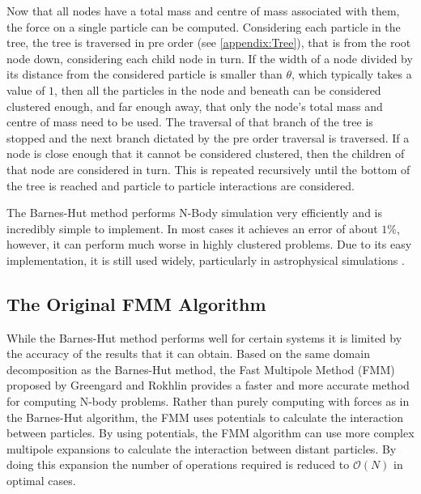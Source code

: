 Now that all nodes have a total mass and centre of mass associated with them, the force on a single particle can be computed. Considering each particle in the tree, the tree is traversed in pre order (see \cref{appendix:Tree}), that is from the root node down, considering each child node in turn. If the width of a node divided by its distance from the considered particle is smaller than $\theta$, which typically takes a value of $1$, then all the particles in the node and beneath can be considered clustered enough, and far enough away, that only the node's total mass and centre of mass need to be used. The traversal of that branch of the tree is stopped and the next branch dictated by the pre order traversal is traversed. If a node is close enough that it cannot be considered clustered, then the children of that node are considered in turn. This is repeated recursively until the bottom of the tree is reached and particle to particle interactions are considered.

The Barnes-Hut method performs N-Body simulation very efficiently and is incredibly simple to implement. In most cases it achieves an error of about $1\%$, however, it can perform much worse in highly clustered problems. Due to its easy implementation, it is still used widely, particularly in astrophysical simulations \cite{Gaburov2010,Capuzzo-DolcettaIstitutoAstronomico,Ishiyama20124.45Problem,Iwasawa2019ImplementationC,Rein2013Large-scaleRings}.

\FloatBarrier
\subsection{The Original FMM Algorithm}

While the Barnes-Hut method performs well for certain systems it is limited by the accuracy of the results that it can obtain. Based on the same domain decomposition as the Barnes-Hut method, the Fast Multipole Method (FMM) proposed by Greengard and Rokhlin \cite{1988The0-262-7110-X.,Rokhlin1985RapidTheory,Greengard1987ASimulations} provides a faster and more accurate method for computing N-body problems. Rather than purely computing with forces as in the Barnes-Hut algorithm, the FMM uses potentials to calculate the interaction between particles. By using potentials, the FMM algorithm can use more complex multipole expansions to calculate the interaction between distant particles. By doing this expansion the number of operations required is reduced to $\mathcal{O}(N)$ in optimal cases.

